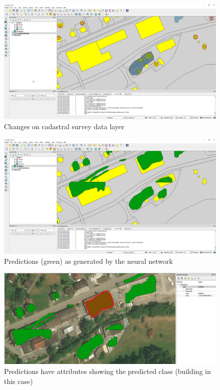 \begin{figure}[H]
    \centering
	\includegraphics[width=1\linewidth]{chapters/practical_results/images/qgis_changes.png}
	\caption{Changes on cadastral survey data layer}
	\label{fig:plugin:changes_cadastral_layer}
\end{figure}

\begin{figure}[H]
    \centering
	\includegraphics[width=1\linewidth]{chapters/practical_results/images/qgis_predictions.png}
	\caption{Predictions (green) as generated by the neural network}
	\label{fig:plugin:predictions}
\end{figure}

\begin{figure}[H]
    \centering
	\includegraphics[width=1\linewidth]{chapters/practical_results/images/qgis_prediction_attributes.png}
	\caption{Predictions have attributes showing the predicted class (building in this case)}
	\label{fig:plugin:prediction_attributes}
\end{figure}

